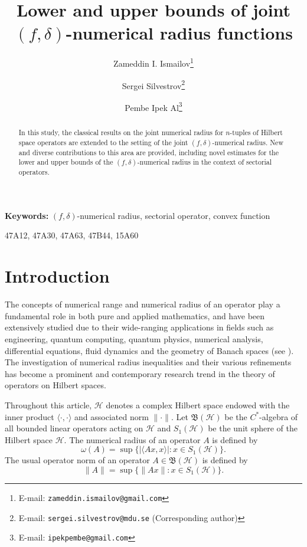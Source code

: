 \documentclass[12pt]{article}
\title{Lower and upper bounds of joint $(f,\delta)$-numerical radius functions}
\author[1]{Zameddin I. Ismailov\thanks{E-mail: \texttt{zameddin.ismailov@gmail.com}}}
\author[2]{Sergei Silvestrov\thanks{E-mail: \texttt{sergei.silvestrov@mdu.se} (Corresponding author)}}
\author[1]{Pembe Ipek Al\thanks{E-mail: \texttt{ipekpembe@gmail.com}}}
\affil[1]{Department of Mathematics, Karadeniz Technical University, Trabzon, Türkiye}
\affil[2]{M\"{a}lardalen University, Department of Business and Mathematics\\
Faculty of Philosophy, Box 883, 72123 V\"{a}ster{\aa}s, Sweden}
\date{} %
\begin{document}

\maketitle

\begin{abstract}
In this study, the classical results on the joint numerical radius for $n$-tuples of Hilbert space operators are extended to the setting of the joint $(f,\delta)$-numerical radius. New and diverse contributions to this area are provided, including novel estimates for the lower and upper bounds of the $(f,\delta)$-numerical radius in the context of sectorial operators.
\end{abstract}
\noindent\textbf{Keywords:}  $(f,\delta)$-numerical radius, sectorial operator, convex function

  47A12, 47A30, 47A63, 47B44, 15A60
\tableofcontents


\smallskip

\smallskip


\section{Introduction}
\label{Sec:1}

The concepts of numerical range and numerical radius of an operator play a
fundamental role in both pure and applied mathematics, and have been extensively
studied due to their wide-ranging applications in fields such as engineering,
quantum computing, quantum physics, numerical analysis, differential equations,
fluid dynamics and the geometry of Banach spaces (see \cite{Axelsson1993,Bonsal1971,Horn1991}).
The investigation of numerical radius inequalities and their various refinements
has become a prominent and contemporary research trend in the theory of operators
on Hilbert spaces.

Throughout this article, $\mathcal{H}$ denotes a complex Hilbert space endowed with the inner
product $\langle \cdot, \cdot\rangle $ and associated norm $\|\cdot\|$. Let $\mathfrak{B}(\mathcal{H})$ be the $C^{*}$-algebra of all bounded linear operators acting on $\mathcal{H}$ and $S_{1}(\mathcal{H})$ be the unit sphere of the Hilbert space $\mathcal{H}$.
The numerical
radius of an operator $A$ is defined by
\[
    \omega(A) = \sup \{ |\langle Ax,x\rangle| : x \in S_{1}(\mathcal{H}) \}.
\]
The usual operator norm of an operator $A \in \mathfrak{B}(\mathcal{H})$
is defined by
\[
    \|A\| = \sup \{ \|Ax\| : x \in S_{1}(\mathcal{H}) \}.
\]
\end{document}
